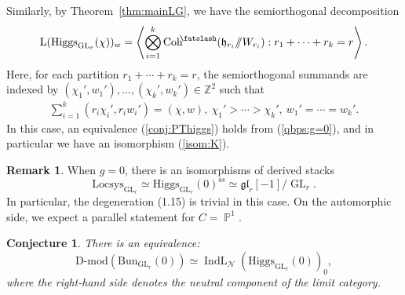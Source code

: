 \documentclass [11pt,oneside,a4paper,mathscr]{amsart}
\newtheorem{conj}[thm]{Conjecture}
\theoremstyle{definition}
\newtheorem{remark}[thm]{Remark}
\newcommand{\PP}{\operatorname{\mathbb P}}
\newcommand{\LL}{\operatorname{L}}
\newcommand{\Coh}{\operatorname{Coh}}
\newcommand{\IndL}{\operatorname{IndL}}
\newcommand{\GL}{\operatorname{GL}}
\newcommand{\shear}{{\mathbin{\mkern-6mu\fatslash}}}
\newcommand{\ssslash}{/\!\!/}
\newcommand{\Hig}{\mathrm{Higgs}}
\newcommand{\Bun}{\mathrm{Bun}}
\begin{document}
Similarly, by Theorem~\ref{thm:mainLG}, 
we have the semiorthogonal decomposition 
\begin{align*}
    \LL(\Hig_{\GL_r}(\chi))_w
    =\left\langle \bigotimes_{i=1}^k \Coh^{\shear}(\mathfrak{h}_{r_i} \ssslash W_{r_i}) : r_1+\cdots+r_k=r\right\rangle.
\end{align*}
Here, for each partition $r_1+\cdots+r_k=r$, the semiorthogonal summands are indexed by 
$(\chi_1', w_1'), \ldots, (\chi_k', w_k') \in \mathbb{Z}^2$ such that 
\begin{align*}
    \sum_{i=1}^k (r_i \chi_i', r_i w_i')=(\chi, w), \ 
    \chi_1'>\cdots>\chi_k', \ w_1'=\cdots=w_k'. 
\end{align*}
In this case, an equivalence (\ref{conj:PThiggs}) holds from (\ref{qbps:g=0}), 
and in particular we have an isomorphism (\ref{isom:K}). 


\begin{remark}\label{rem:g0-trivial-degeneration}
When $g=0$, there is an isomorphisms of derived stacks
\[
  \mathrm{Locsys}_{\GL_r} \simeq \Hig_{\GL_r}(0)^{\mathrm ss}
  \simeq \mathfrak{gl}_r[-1]/\GL_r .
\]
In particular, the degeneration (1.15) is trivial in this case.
On the automorphic side, we expect a parallel statement for $C=\PP^1$.

\begin{conj}
    There is an equivalence:
    \[
  \mathrm{D\text{-}mod}\left(\Bun_{\GL_r}(0)\right)
  \simeq \IndL_{\mathcal{N}}\left(\Hig_{\GL_r}(0)\right)_0,
\]
where the right-hand side denotes the neutral component of the limit category.
\end{conj}


\end{remark}
\end{document}
